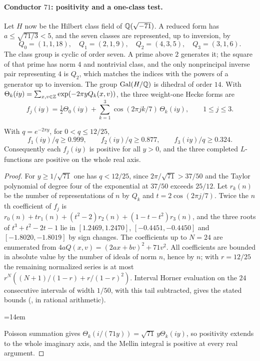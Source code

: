 \paragraph{Conductor $71$: positivity and a one-class test.}
Let $H$ now be the Hilbert class field of $\mathbb{Q}(\sqrt{-71})$. A reduced form has $a\le\sqrt{71/3}<5$, and
the seven classes are represented, up to inversion, by
\[
 Q_0=(1,1,18),\quad Q_1=(2,1,9),\quad Q_2=(4,3,5),\quad Q_3=(3,1,6).
\]
The class group is cyclic of order seven. A prime above $2$ generates it; the square of that prime has norm
$4$ and nontrivial class, and the only nonprincipal inverse pair representing $4$ is $Q_2$, which matches
the indices with the powers of a generator up to inversion. The group $\operatorname{Gal}(H/\mathbb{Q})$ is dihedral of order
$14$. With $\Theta_k(iy)=\sum_{x,v\in\mathbb{Z}}\exp(-2\pi yQ_k(x,v))$, the three weight-one Hecke forms are
\[
 f_j(iy)=\tfrac12\Theta_0(iy)+\sum_{k=1}^3\cos(2\pi jk/7)\,\Theta_k(iy),\qquad1\le j\le3.
\]

\begin{proposition}\label{hec:prop:pos71}
With $q=e^{-2\pi y}$, for $0<q\le12/25$,
\[
 f_1(iy)/q\ge0.999,\qquad f_2(iy)/q\ge0.877,\qquad f_3(iy)/q\ge0.324 .
\]
Consequently each $f_j(iy)$ is positive for all $y>0$, and the three completed $L$-functions are positive
on the whole real axis.
\end{proposition}

\begin{proof}
For $y\ge1/\sqrt{71}$ one has $q<12/25$, since $2\pi/\sqrt{71}>37/50$ and the Taylor polynomial of degree
four of the exponential at $37/50$ exceeds $25/12$. Let $r_k(n)$ be the number of representations of $n$ by
$Q_k$ and $t=2\cos(2\pi j/7)$. Twice the $n$th coefficient of $f_j$ is
$r_0(n)+tr_1(n)+(t^2-2)r_2(n)+(1-t-t^2)r_3(n)$, and the three roots of $t^3+t^2-2t-1$ lie in
$[1.2469,1.2470]$, $[-0.4451,-0.4450]$ and $[-1.8020,-1.8019]$ by sign changes. The coefficients up to
$N=24$ are enumerated from $4aQ(x,v)=(2ax+bv)^2+71v^2$. All coefficients are bounded in absolute value by
the number of ideals of norm $n$, hence by $n$; with $r=12/25$ the remaining normalized series is at most
$r^N((N+1)/(1-r)+r/(1-r)^2)$. Interval Horner evaluation on the $24$ consecutive intervals of width $1/50$,
with this tail subtracted, gives the stated bounds (, in
rational arithmetic).{\emergencystretch=14em\par}
Poisson summation gives $\Theta_k(i/(71y))=\sqrt{71}\,y\Theta_k(iy)$, so positivity
extends to the whole imaginary axis, and the Mellin integral is positive at every real argument.
\end{proof}

